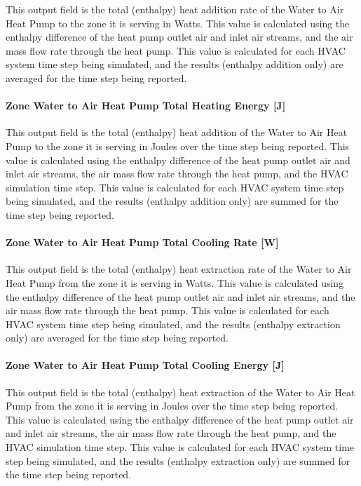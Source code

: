 This output field is the total (enthalpy) heat addition rate of the Water to Air Heat Pump to the zone it is serving in Watts. This value is calculated using the enthalpy difference of the heat pump outlet air and inlet air streams, and the air mass flow rate through the heat pump. This value is calculated for each HVAC system time step being simulated, and the results (enthalpy addition only) are averaged for the time step being reported.

\paragraph{Zone Water to Air Heat Pump Total Heating Energy {[}J{]}}\label{zone-water-to-air-heat-pump-total-heating-energy-j}

This output field is the total (enthalpy) heat addition of the Water to Air Heat Pump to the zone it is serving in Joules over the time step being reported. This value is calculated using the enthalpy difference of the heat pump outlet air and inlet air streams, the air mass flow rate through the heat pump, and the HVAC simulation time step. This value is calculated for each HVAC system time step being simulated, and the results (enthalpy addition only) are summed for the time step being reported.

\paragraph{Zone Water to Air Heat Pump Total Cooling Rate {[}W{]}}\label{zone-water-to-air-heat-pump-total-cooling-rate-w}

This output field is the total (enthalpy) heat extraction rate of the Water to Air Heat Pump from the zone it is serving in Watts. This value is calculated using the enthalpy difference of the heat pump outlet air and inlet air streams, and the air mass flow rate through the heat pump. This value is calculated for each HVAC system time step being simulated, and the results (enthalpy extraction only) are averaged for the time step being reported.

\paragraph{Zone Water to Air Heat Pump Total Cooling Energy {[}J{]}}\label{zone-water-to-air-heat-pump-total-cooling-energy-j}

This output field is the total (enthalpy) heat extraction of the Water to Air Heat Pump from the zone it is serving in Joules over the time step being reported. This value is calculated using the enthalpy difference of the heat pump outlet air and inlet air streams, the air mass flow rate through the heat pump, and the HVAC simulation time step. This value is calculated for each HVAC system time step being simulated, and the results (enthalpy extraction only) are summed for the time step being reported.

